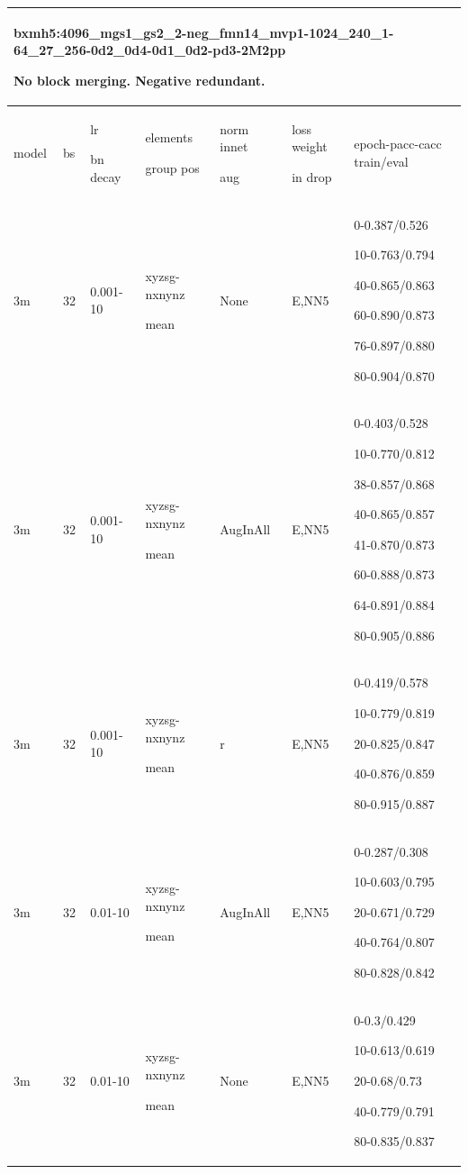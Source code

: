 \documentclass[,table,dvipsnames]{article}
\begin{document}
\begin{tabular}{|p{1.5cm}|p{1cm}|p{2cm}|p{1.5cm}|p{1.5cm}|p{1.5cm}|p{5cm}| }
	\hline
	\multicolumn{7}{|p{14cm}|}{bxmh5:4096\_mgs1\_gs2\_2-neg\_fmn14\_mvp1-1024\_240\_1-64\_27\_256-0d2\_0d4-0d1\_0d2-pd3-2M2pp\par 
		No block merging. Negative redundant. }\\
	\hline
	
	model & bs& lr\par bn decay & elements\par group pos & norm innet\par aug & loss weight\par in drop & epoch-pacc-cacc train/eval \\
	\hline\hline
	
	\rowcolor{yellow!20}
	3m & 32 & 0.001-10 & xyzsg-nxnynz\par mean & None & E,NN5 & 0-0.387/0.526\par 10-0.763/0.794\par 40-0.865/0.863\par 60-0.890/0.873\par 76-0.897/0.880\par 80-0.904/0.870\\
	
	\rowcolor{orange!20}
	3m & 32 & 0.001-10 & xyzsg-nxnynz\par mean & AugInAll & E,NN5 & 0-0.403/0.528\par 10-0.770/0.812\par 38-0.857/0.868\par 40-0.865/0.857\par 41-0.870/0.873\par 60-0.888/0.873\par 64-0.891/0.884\par 80-0.905/0.886\\ 
	
	\rowcolor{green!20}
	3m & 32 & 0.001-10 & xyzsg-nxnynz\par mean & r & E,NN5 & 0-0.419/0.578\par 10-0.779/0.819\par 20-0.825/0.847\par 40-0.876/0.859\par 80-0.915/0.887 \\
	
	\rowcolor{blue!20}
	3m & 32 & 0.01-10 & xyzsg-nxnynz\par mean & AugInAll & E,NN5 & 0-0.287/0.308\par 10-0.603/0.795\par 20-0.671/0.729\par 40-0.764/0.807\par 80-0.828/0.842\\
	
	\rowcolor{red!20}
	3m & 32 & 0.01-10 & xyzsg-nxnynz\par mean& None & E,NN5 & 0-0.3/0.429\par 
	10-0.613/0.619\par 20-0.68/0.73\par 40-0.779/0.791\par 80-0.835/0.837\\
	\hline	
\end{tabular}
\end{document}
